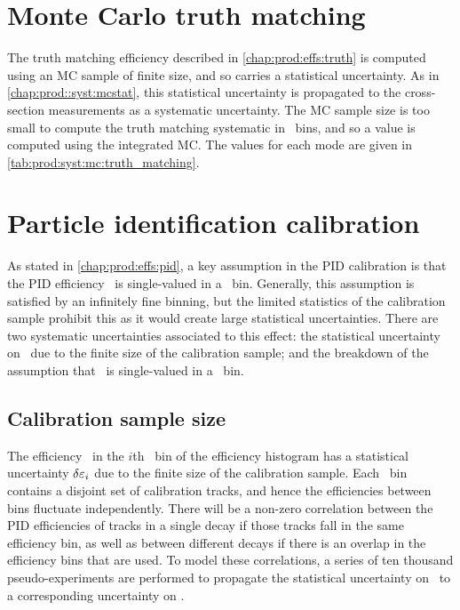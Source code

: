 \section{Monte Carlo truth matching}
\label{chap:prod:syst:mc:truth_matching}

The truth matching efficiency described in \cref{chap:prod:effs:truth} is computed using an \ac{MC} 
sample of finite size, and so carries a statistical uncertainty.
As in \cref{chap:prod::syst:mcstat}, this statistical uncertainty is propagated to the cross-section 
measurements as a systematic uncertainty.
The \ac{MC} sample size is too small to compute the truth matching systematic 
in \pTy\ bins, and so a value is computed using the integrated \ac{MC}.
The values for each mode are given in \cref{tab:prod:syst:mc:truth_matching}.

\section{Particle identification calibration}
\label{chap:prod:syst:pid}

As stated in \cref{chap:prod:effs:pid}, a key assumption in the \ac{PID} 
calibration is that the \ac{PID} efficiency \effpid\ is single-valued in a 
\ptotetanspd\ bin.
Generally, this assumption is satisfied by an infinitely fine binning, but the 
limited statistics of the calibration sample prohibit this as it would create 
large statistical uncertainties.
There are two systematic uncertainties associated to this effect: the 
statistical uncertainty on \effpid\ due to the finite size of the calibration 
sample; and the breakdown of the assumption that \effpid\ is single-valued in a 
\ptotetanspd\ bin.

\subsection{Calibration sample size}
\label{chap:prod:syst:pid:stat}

The efficiency \effi\ in the $i$th \ptotetanspd\ bin of the efficiency 
histogram has a statistical uncertainty $\delta{\ensuremath{\varepsilon_{i}}}$ due to the finite size of 
the calibration sample.
Each \ptotetanspd\ bin contains a disjoint set of calibration tracks, and hence 
the efficiencies between bins fluctuate independently.
There will be a non-zero correlation between the \ac{PID} efficiencies of 
tracks in a single decay if those tracks fall in the same efficiency bin, as 
well as between different decays if there is an overlap in the efficiency bins 
that are used.
To model these correlations, a series of ten thousand pseudo-experiments are 
performed to propagate the statistical uncertainty on \effi\ to a corresponding 
uncertainty on \effpid.

